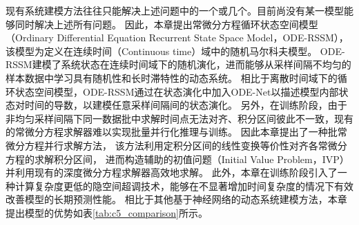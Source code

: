 现有系统建模方法往往只能解决上述问题中的一个或几个。目前尚没有某一模型能够同时解决上述所有问题。
因此，本章提出常微分方程循环状态空间模型（Ordinary Differential Equation Recurrent State Space Model，ODE-RSSM），该模型为定义在连续时间（Continuous time）域中的随机马尔科夫模型。
ODE-RSSM建模了系统状态在连续时间域下的随机演化，进而能够从采样间隔不均匀的样本数据中学习具有随机性和长时滞特性的动态系统。
相比于离散时间域下的循环状态空间模型，ODE-RSSM通过在状态演化中加入ODE-Net以描述模型内部状态对时间的导数，以建模任意采样间隔间的状态演化。
另外，在训练阶段，由于非均匀采样间隔下同一数据批中求解时间点无法对齐、积分区间彼此不一致，现有的常微分方程求解器难以实现批量并行化推理与训练。
因此本章提出了一种批常微分方程并行求解方法，
该方法利用定积分区间的线性变换等价性对齐各常微分方程的求解积分区间，
进而构造辅助的初值问题（Initial Value Problem，IVP）
并利用现有的深度微分方程求解器高效地求解。
此外，本章在训练阶段引入了一种计算复杂度更低的隐空间超调技术，能够在不显著增加时间复杂度的情况下有效改善模型的长期预测性能。
相比于其他基于神经网络的动态系统建模方法，本章提出模型的优势如表\ref{tab:c5_comparison}所示。
